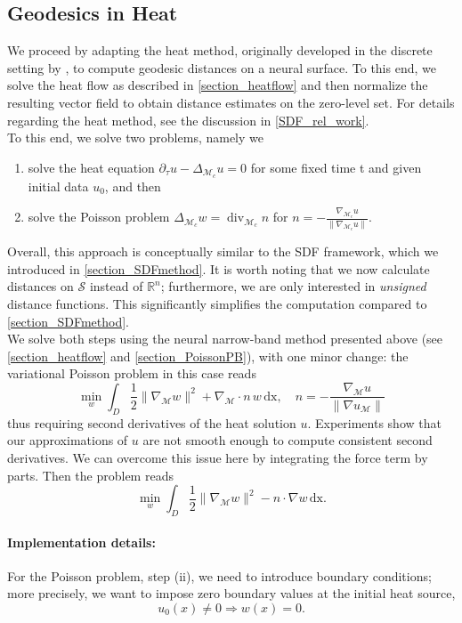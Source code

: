 \documentclass[12pt,openany]{book}
\newcommand{\R}{\mathbb{R}}
\def\S{\mathcal{S}}
\theoremstyle{plainnormal}
\theoremstyle{remark}
\begin{document}
\subsection{Geodesics in Heat}
We proceed by adapting the heat method, originally developed in the discrete setting by \cite{Crane_2013}, to compute geodesic distances on a neural surface. To this end, we solve the heat flow as described in \cref{section_heatflow} and then normalize the resulting vector field to obtain distance estimates on the zero-level set. For details regarding the heat method, see the discussion in \cref{SDF_rel_work}. \\
To this end, we solve two problems, namely we
\begin{enumerate}
    \item solve the heat equation $\partial_\tau u - \Delta_{\mathcal{M}_c} u = 0$ for some fixed time t and given initial data $u_0$, and then
    \item solve the Poisson problem $\Delta_{\mathcal{M}_c} w = \operatorname{div}_{\mathcal{M}_c}  n$ for $ n = -\frac{\nabla_{\mathcal{M}_c} u}{\|\nabla_{\mathcal{M}_c} u\|}$.
\end{enumerate}
Overall, this approach is conceptually similar to the SDF framework, which we introduced in \cref{section_SDFmethod}. 
It is worth noting that we now calculate distances on $\S$ instead of $\R^n$; furthermore, we are only interested in \emph{unsigned} distance functions. This significantly simplifies the computation compared to \cref{section_SDFmethod}.\\
We solve both steps using the neural narrow-band method presented above (see \cref{section_heatflow} and \cref{section_PoissonPB}), with one minor change: the variational Poisson problem in this case reads 
$$\min_w\int_D \frac{1}{2}\|\nabla_\mathcal{M}w\|^2 + \nabla_{\mathcal{M}} \cdot n \, w \,\mathrm{dx}, \quad n = - \frac{\nabla_{\mathcal{M}} u}{\|\nabla u_{\mathcal{M}}\|}$$
thus requiring second derivatives of the heat solution $u$. Experiments show that our approximations of $u$ are not smooth enough to compute consistent second derivatives. We can overcome this issue here by integrating the force term by parts. Then the problem reads 
$$\min_w\int_D \frac{1}{2}\|\nabla_\mathcal{M}w\|^2 - n\cdot \nabla w \,\mathrm{dx}.$$
\paragraph{Implementation details:}
For the Poisson problem, step (ii), we need to introduce boundary conditions; more precisely, we want to impose zero boundary values at the initial heat source, $$u_0(x) \neq 0 \Rightarrow w(x) = 0.$$
\end{document}
